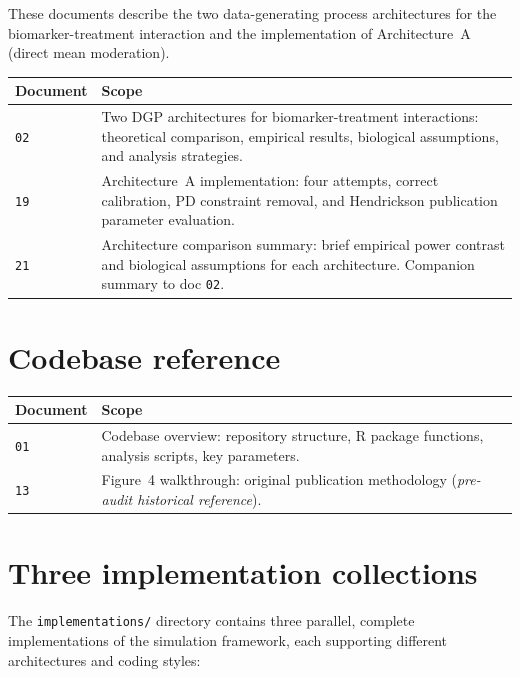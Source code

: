\documentclass[11pt]{article}
\begin{document}
These documents describe the two data-generating process
architectures for the biomarker-treatment interaction and the
implementation of Architecture~A (direct mean moderation).

\begin{center}
\begin{tabular}{lp{9cm}}
\toprule
\textbf{Document} & \textbf{Scope} \\
\midrule
\texttt{02} & Two DGP architectures for biomarker-treatment
  interactions: theoretical comparison, empirical results,
  biological assumptions, and analysis strategies. \\
\texttt{19} & Architecture~A implementation: four attempts,
  correct calibration, PD constraint removal, and
  Hendrickson publication parameter evaluation. \\
\texttt{21} & Architecture comparison summary: brief empirical
  power contrast and biological assumptions for each
  architecture. Companion summary to doc \texttt{02}. \\
\bottomrule
\end{tabular}
\end{center}

\section{Codebase reference}

\begin{center}
\begin{tabular}{lp{9cm}}
\toprule
\textbf{Document} & \textbf{Scope} \\
\midrule
\texttt{01} & Codebase overview: repository structure, R
  package functions, analysis scripts, key parameters. \\
\texttt{13} & Figure~4 walkthrough: original publication
  methodology (\textit{pre-audit historical reference}). \\
\bottomrule
\end{tabular}
\end{center}

\section{Three implementation collections}

The \texttt{implementations/} directory contains three parallel,
complete implementations of the simulation framework, each
supporting different architectures and coding styles:
\end{document}
